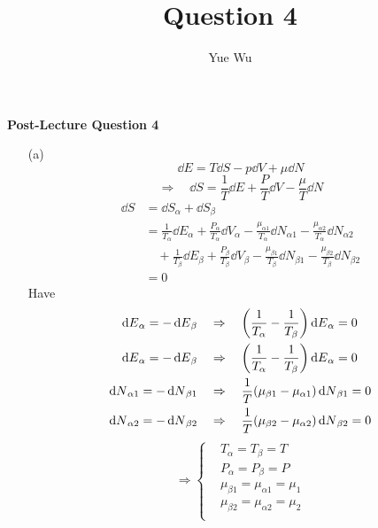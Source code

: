 \documentclass{article}
\title{Question 4}
\author{Yue Wu}
\begin{document}
    \begin{center}
        \LARGE\textbf{Post-Lecture Question 4}
    \end{center}

    \begin{enumerate}
        \item[(a)]
        $$\dd{E}=T\dd{S}-p\dd{V}+\mu\dd{N}$$
        $$\Rightarrow\quad\dd{S}=\frac{1}{T}\dd{E}+\frac{P}{T}\dd{V}-\frac{\mu}{T}\dd{N}$$
        \begin{align*}
            \dd{S}&=\dd{S}_\alpha+\dd{S}_\beta\\
            &=\frac{1}{T_\alpha}\dd{E}_\alpha+\frac{P_\alpha}{T_\alpha}\dd{V}_\alpha-\frac{\mu_{\alpha 1}}{T_{\alpha}}\dd{N}_{\alpha 1}-\frac{\mu_{\alpha 2}}{T_\alpha}\dd{N}_{\alpha 2}\\
            &\quad +\frac{1}{T_\beta}\dd{E}_\beta+\frac{P_\beta}{T_\beta}\dd{V}_\beta-\frac{\mu_{\beta 1}}{T_{\beta}}\dd{N}_{\beta 1}-\frac{\mu_{\beta 2}}{T_\beta}\dd{N}_{\beta 2}\\
            &=0
        \end{align*}
        Have
        \begin{align*}
            \dd{E}_\alpha=-\dd{E}_\beta\quad&\Rightarrow\quad\qty(\frac{1}{T_\alpha}-\frac{1}{T_\beta})\dd{E}_\alpha=0\\
            \dd{E}_\alpha=-\dd{E}_\beta\quad&\Rightarrow\quad\qty(\frac{1}{T_\alpha}-\frac{1}{T_\beta})\dd{E}_\alpha=0\\
            \dd{N}_{\alpha 1}=-\dd{N}_{\beta 1}\quad&\Rightarrow\quad\frac{1}{T}\qty(\mu_{\beta 1}-\mu_{\alpha 1})\dd{N}_{\beta 1}=0\\
            \dd{N}_{\alpha 2}=-\dd{N}_{\beta 2}\quad&\Rightarrow\quad\frac{1}{T}\qty(\mu_{\beta 2}-\mu_{\alpha 2})\dd{N}_{\beta 2}=0\\
        \end{align*}
        $$\Rightarrow\left\{\begin{aligned}
            &T_\alpha=T_\beta=T\\
            &P_\alpha=P_\beta=P\\
            &\mu_{\beta 1}=\mu_{\alpha 1}=\mu_1\\
            &\mu_{\beta 2}=\mu_{\alpha 2}=\mu_2\\
        \end{aligned}\right.$$


\end{enumerate}
\end{document}
